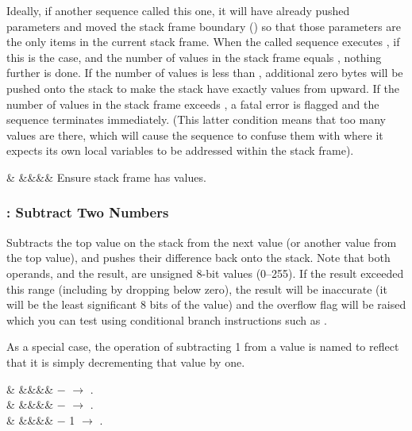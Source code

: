 \documentclass[letterpaper,twoside,onecolumn,openright,final]{memoir}
\begin{document}
{Ideally, if another sequence called this one, it will have already pushed parameters
and moved the stack frame boundary () so that those parameters are the only
items in the current stack frame.  When the called sequence executes , if this
is the case, and the number of values in the stack frame equals ,
nothing further is done.  If the number of values is less than , additional zero bytes
will be pushed onto the stack to make the stack have exactly  values from 
upward.  If the number of values in the stack frame exceeds , a fatal error is flagged
and the sequence terminates immediately.  (This latter condition means that too many values
are there, which will cause the sequence to confuse them with where it expects its own
local variables to be addressed within the stack frame).

\begin{opdesc}
   & &&&\z{\#}& Ensure stack frame has  values.\\
\end{opdesc}

\subsubsection{: Subtract Two Numbers}
Subtracts the top value on the stack from the next value (or another value from the top value),
and pushes their difference back onto the 
stack.  Note that both operands, and the result, are unsigned 8-bit values (0--255).
If the result exceeded this range (including by dropping below zero), 
the result will be inaccurate (it will be the least
significant 8 bits of the value) and the overflow flag will be raised which you can test
using conditional branch instructions such as .

As a special case, the operation of subtracting 1 from a value is named  to reflect that it
is simply decrementing that value by one.

\begin{opdesc}
   &            &&&\z{\$,\$}&  $-$  $\rightarrow$ .\\
   &    &&&\z{\$,\#}&  $-$  $\rightarrow$ .\\
   &            &&&\z{\$}&  $-$ 1 $\rightarrow$ .\\
\end{opdesc}


}
\end{document}
